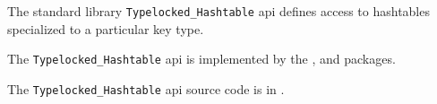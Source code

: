 
The standard library {\tt Typelocked\_Hashtable} api defines access to hashtables 
specialized to a particular key type.

The {\tt Typelocked\_Hashtable} api is implemented by the 
, 
 and 
 packages. 

The {\tt Typelocked\_Hashtable} api source code is in .





